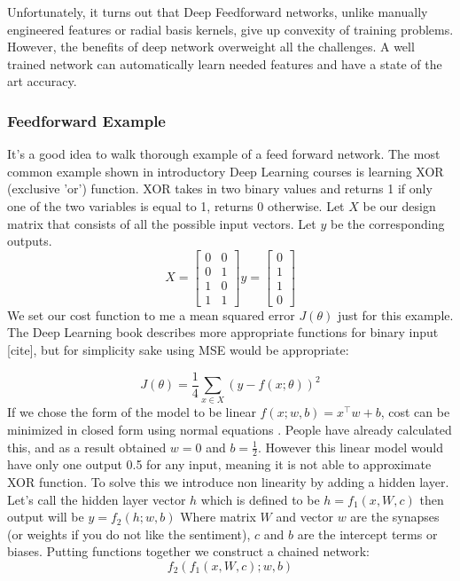 \documentclass[paper=a4, fontsize=11pt]{scrartcl}
\numberwithin{equation}{section}		%
\numberwithin{figure}{section}			%
\numberwithin{table}{section}			%
\begin{document}
	Unfortunately, it turns out that Deep Feedforward networks, unlike manually engineered features or radial basis kernels, give up convexity of training problems. However, the benefits of deep network overweight all the challenges. A well trained network can automatically learn needed features and have a state of the art accuracy.
	
	
	\subsubsection{Feedforward Example}
	It's a good idea to walk thorough example of a feed forward network. The most common example shown in introductory Deep Learning courses is learning XOR (exclusive 'or') function. XOR takes in two binary values and returns 1 if only one of the two variables is equal to 1, returns 0 otherwise.
	Let $X$ be our design matrix that consists of all the possible input vectors. Let $y$ be the corresponding outputs. 
		$$ X = 
		\begin{bmatrix}
			0 & 0 \\
			0 & 1 \\
			1 & 0 \\
			1 & 1
		\end{bmatrix} 
		y = 
		\begin{bmatrix}
		0 \\
		1 \\
		1 \\
		0 
		\end{bmatrix}$$
	We set our cost function to me a mean squared error $J(\theta)$ just for this example. The Deep Learning book describes more appropriate functions for binary input [cite], but for simplicity sake using MSE would be appropriate:
	
		$$ J(\theta)=\frac{1}{4}\sum_{x\in X}^{}(y-f(x;\theta))^2 $$
	If we chose the form of the model to be linear $ f(x;w,b)=x^\top w + b $, cost can be minimized in closed form using normal equations \cite{Goodfellow-et-al-2016}. People have already calculated this, and as a result obtained $ w = 0 $ and $ b = \frac{1}{2}$. However this linear model would have only one output 0.5 for any input, meaning it is not able to approximate XOR function. To solve this we introduce non linearity by adding a hidden layer. Let's call the hidden layer vector $h$ which is defined to be $ h = f_1(x,W,c) $ then output will be $ y = f_2(h;w,b)$ Where matrix $W$ and vector $w$ are the synapses (or weights if you do not like the sentiment), $c$ and $b$ are the intercept terms or biases. Putting functions together we construct a chained network:
		$$ f_2(f_1(x,W,c);w,b) $$
	
\end{document}

